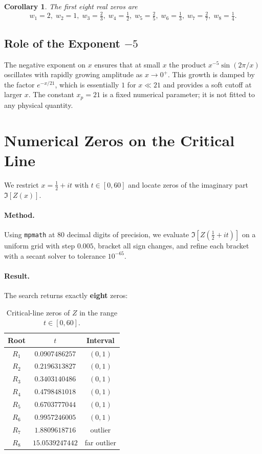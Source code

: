 \documentclass[11pt,a4paper]{article}
\newtheorem{corollary}{Corollary}
\begin{document}
\begin{corollary}
The first eight real zeros are
\[
w_1=2,\; w_2=1,\; w_3=\tfrac{2}{3},\; w_4=\tfrac{1}{2},\;
w_5=\tfrac{2}{5},\; w_6=\tfrac{1}{3},\; w_7=\tfrac{2}{7},\; w_8=\tfrac{1}{4}.
\]
\end{corollary}

\subsection{Role of the Exponent $-5$}

The negative exponent on $x$ ensures that at small $x$ the product
$x^{-5}\sin(2\pi/x)$ oscillates with rapidly growing amplitude as
$x\to 0^{+}$. This growth is damped by the factor $e^{-x/21}$,
which is essentially $1$ for $x\ll 21$ and provides a soft cutoff
at larger $x$. The constant $x_p = 21$ is a fixed numerical
parameter; it is not fitted to any physical quantity.

\section{Numerical Zeros on the Critical Line}

We restrict $x = \tfrac{1}{2}+it$ with $t\in[0,60]$ and locate
zeros of the imaginary part $\Im[Z(x)]$.

\paragraph{Method.}
Using \texttt{mpmath} at 80 decimal digits of precision, we evaluate
$\Im[Z(\tfrac12+it)]$ on a uniform grid with step $0.005$, bracket
all sign changes, and refine each bracket with a secant solver to
tolerance $10^{-65}$.

\paragraph{Result.}
The search returns exactly \textbf{eight} zeros:

\begin{table}[h]
\centering
\begin{tabular}{c|c|c}
\toprule
Root & $t$ & Interval \\
\midrule
$R_1$ & $0.0907486257$ & $(0,1)$ \\
$R_2$ & $0.2196313827$ & $(0,1)$ \\
$R_3$ & $0.3403140486$ & $(0,1)$ \\
$R_4$ & $0.4798481018$ & $(0,1)$ \\
$R_5$ & $0.6703777044$ & $(0,1)$ \\
$R_6$ & $0.9957246005$ & $(0,1)$ \\
$R_7$ & $1.8809618716$ & outlier \\
$R_8$ & $15.0539247442$ & far outlier \\
\bottomrule
\end{tabular}
\caption{Critical-line zeros of $Z$ in the range $t\in[0,60]$.}
\label{tab:zeros}
\end{table}
\end{document}
